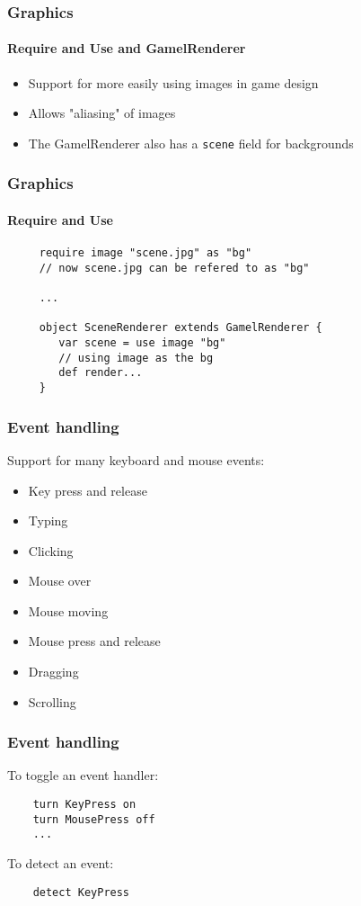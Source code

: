 \documentclass{beamer}
\begin{document}
\begin{frame}
    \frametitle{Graphics}
    \framesubtitle{Require and Use and GamelRenderer}
    \begin{itemize}[<+->]
        \item{Support for more easily using images in game design}
        \item{Allows "aliasing" of images}
        \item{The GamelRenderer also has a \texttt{scene} field for backgrounds}
    \end{itemize}
\end{frame}

\begin{frame}[fragile]
    \frametitle{Graphics}
    \framesubtitle{Require and Use}
    \begin{lstlisting}
     require image "scene.jpg" as "bg"
     // now scene.jpg can be refered to as "bg"

     ...

     object SceneRenderer extends GamelRenderer {
        var scene = use image "bg"
        // using image as the bg
        def render...
     }
    \end{lstlisting}
\end{frame}

\begin{frame}
    \frametitle{Event handling}
    Support for many keyboard and mouse events:
    \begin{multicols}{2}
    \begin{itemize}[<+->]
        \item{Key press and release}
        \item{Typing}
        \item{Clicking}
        \item{Mouse over}
        \item{Mouse moving}
        \item{Mouse press and release}
        \item{Dragging}
        \item{Scrolling}
    \end{itemize}
    \end{multicols}
\end{frame}

\begin{frame}[fragile]
    \frametitle{Event handling}
    To toggle an event handler:
    \begin{lstlisting}
    turn KeyPress on
    turn MousePress off
    ...
    \end{lstlisting}

    To detect an event:
    \begin{lstlisting}
    detect KeyPress
    \end{lstlisting}
\end{frame}
\end{document}
